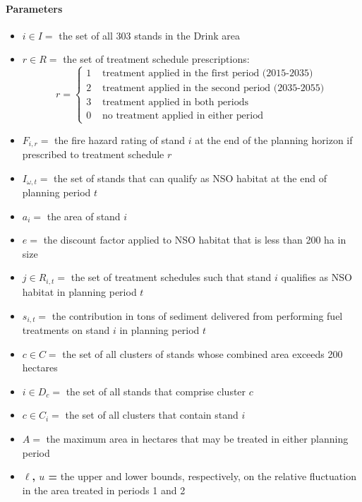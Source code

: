 \paragraph{Parameters}
\begin{itemize}
\item \textbf{$i \in I = $} the set of all 303 stands in the Drink area
\item \textbf{$r \in R = $} the set of treatment schedule prescriptions:
	$$
	r =
	\begin{cases}
	1 &\text{ treatment applied in the first period (2015-2035)}\\
	2 &\text{ treatment applied in the second period (2035-2055)}\\
	3 &\text{ treatment applied in both periods}\\
	0 &\text{ no treatment applied in either period}
	\end{cases}
	$$
\item \textbf{$F_{i,r} = $} the fire hazard rating of stand $i$ at the end of the planning horizon if prescribed to treatment schedule $r$
\item \textbf{$I_{\omega,t} = $} the set of stands that can qualify as NSO habitat at the end of planning period $t$
\item \textbf{$a_i = $} the area of stand $i$
\item \textbf{$e = $} the discount factor applied to NSO habitat that is less than 200 ha in size
\item \textbf{$j \in R_{i,t} = $} the set of treatment schedules such that stand $i$ qualifies as NSO habitat in planning period $t$
\item \textbf{$s_{i,t} = $} the contribution in tons of sediment delivered from performing fuel treatments on stand $i$ in planning period $t$
\item \textbf{$c \in C = $} the set of all clusters of stands whose combined area exceeds 200 hectares
\item \textbf{$i \in D_c = $} the set of all stands that comprise cluster $c$
\item \textbf{$c \in C_i = $} the set of all clusters that contain stand $i$
\item \textbf{$A = $} the maximum area in hectares that may be treated in either planning period
\item \textbf{$\ell$, $u$ = } the upper and lower bounds, respectively, on the relative fluctuation in the area treated in periods 1 and 2
\end{itemize}

